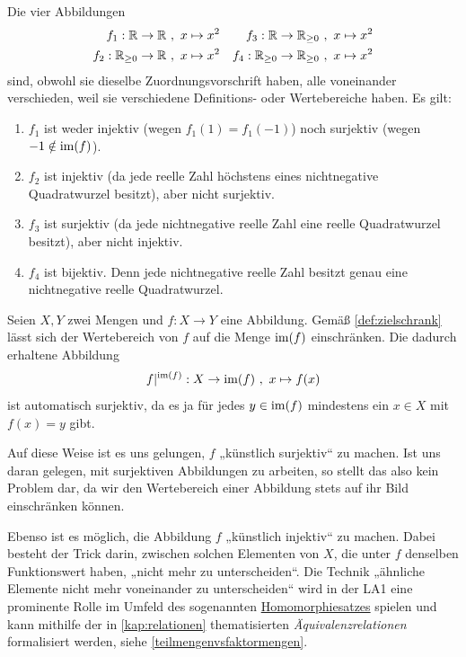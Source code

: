 \begin{bsp} \label{bsp:injsur}
    Die vier Abbildungen
    \begin{align*}
        f_1 : \mathbb R \to \mathbb R \ &,\ x\mapsto x^2 & f_3 :\mathbb R\to \mathbb R_{\ge 0} \ &,\ x\mapsto x^2 \\
        f_2 : \mathbb R_{\ge 0} \to \mathbb R \ &,\ x\mapsto x^2 & f_4 :\mathbb R_{\ge 0} \to \mathbb R_{\ge 0} \ &,\ x\mapsto x^2
    \end{align*}
    sind, obwohl sie dieselbe Zuordnungsvorschrift haben, alle voneinander verschieden, weil sie verschiedene Definitions- oder Wertebereiche haben. Es gilt:
    \begin{enumerate}
        \item $f_1$ ist weder injektiv (wegen $f_1(1)=f_1(-1)$) noch surjektiv (wegen $-1\notin \operatorname{im}(f)$).
        \item $f_2$ ist injektiv (da jede reelle Zahl höchstens eines nichtnegative Quadratwurzel besitzt), aber nicht surjektiv.
        \item $f_3$ ist surjektiv (da jede nichtnegative reelle Zahl eine reelle Quadratwurzel besitzt), aber nicht injektiv.
        \item $f_4$ ist bijektiv. Denn jede nichtnegative reelle Zahl besitzt genau eine nichtnegative reelle Quadratwurzel.
    \end{enumerate}
\end{bsp}


\begin{vorschau} \label{surjektivmachen}
    Seien $X,Y$ zwei Mengen und $f:X\to Y$ eine Abbildung. Gemäß \cref{def:zielschrank} lässt sich der Wertebereich von $f$ auf die Menge $\operatorname{im}(f)$ einschränken. Die dadurch erhaltene Abbildung
        \[ f\vert^{\operatorname{im}(f)} : X \to \operatorname{im}(f) \ ,\ x\mapsto f(x) \]
    ist automatisch surjektiv, da es ja für jedes $y\in \operatorname{im}(f)$ mindestens ein $x\in X$ mit $f(x)=y$ gibt.

    Auf diese Weise ist es uns gelungen, $f$ „künstlich surjektiv“ zu machen. Ist uns daran gelegen, mit surjektiven Abbildungen zu arbeiten, so stellt das also kein Problem dar, da wir den Wertebereich einer Abbildung stets auf ihr Bild einschränken können.

    Ebenso ist es möglich, die Abbildung $f$ „künstlich injektiv“ zu machen. Dabei besteht der Trick darin, zwischen solchen Elementen von $X$, die unter $f$ denselben Funktionswert haben, „nicht mehr zu unterscheiden“. Die Technik „ähnliche Elemente nicht mehr voneinander zu unterscheiden“ wird in der LA1 eine prominente Rolle im Umfeld des sogenannten \href{https://de.wikipedia.org/wiki/Homomorphiesatz}{Homomorphiesatzes} spielen und kann mithilfe der in \cref{kap:relationen} thematisierten \emph{Äquivalenzrelationen} formalisiert werden, siehe \cref{teilmengenvsfaktormengen}.
\end{vorschau}





